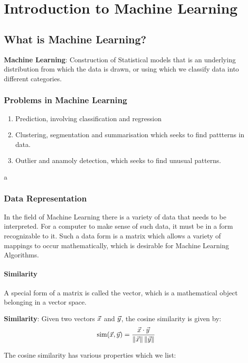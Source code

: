 \chapter{Introduction to Machine Learning}

\section{What is Machine Learning?}
\begin{ddef}
	\textbf{Machine Learning}: Construction of Statistical models that is an underlying distribution from which the data is drawn, or using which we classify data into different categories. 
\end{ddef}
\subsection{Problems in Machine Learning}
\begin{enumerate}
	\item Prediction, involving classification and regression
	\item Clustering, segmentation and summarisation which seeks to find pattterns in data.
	\item Outlier and anamoly detection, which seeks to find unusual patterns. 
		
\end{enumerate}a
\subsection{Data Representation}
In the field of Machine Learning there is a variety of data that needs to be interpreted. For a computer to make sense of such data, it must be in a form recognizable to it. Such a data form is a matrix which allows a variety of mappings to occur mathematically, which is desirable for Machine Learning Algorithms.
\subsubsection{Similarity}
A special form of a matrix is called the vector, which is a mathematical object belonging in a vector space. 

\begin{ddef}
	\textbf{Similarity}: Given two vectors $\vec{x}$ and $\vec{y}$, the cosine similarity is given by:
	\begin{equation}
		\text{sim}(\vec{x}, \vec{y}) = \frac{\vec{x}\cdot \vec{y}}{\left\lVert\vec{x}\right\rVert\left\lVert\vec{y}\right\rVert}
	\end{equation} 
\end{ddef}
The cosine similarity has various properties which we list:

